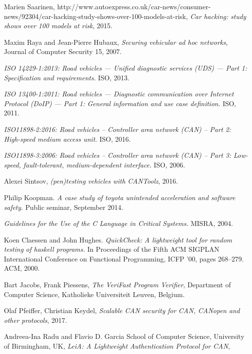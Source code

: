 \documentclass[11pt]{article}
\begin{document}
\begin{thebibliography}{10}
	Marien Saarinen, http://www.autoexpress.co.uk/car-news/consumer-news/92304/car-hacking-study-shows-over-100-models-at-risk, 
	\textit{Car hacking: study shows over 100 models at risk},
	2015.
	
	Maxim Raya and Jean-Pierre Hubaux, \textit{Securing vehicular ad hoc networks}, Journal of Computer Security 15, 2007.

	\textit{ISO 14229-1:2013: Road vehicles — Unified diagnostic services (UDS) — Part 1: Specification and requirements.}
	ISO, 2013.
	
	\textit{ISO 13400-1:2011: Road vehicles — Diagnostic communication over Internet Protocol (DoIP) — Part 1: General information and use case definition.} ISO, 2011.
	
	\textit{ISO11898-2:2016: Road vehicles -- Controller area network (CAN) -- Part 2: High-speed medium access unit.} ISO, 2016.
	
	\textit{ISO11898-3:2006: Road vehicles -- Controller area network (CAN) -- Part 3: Low-speed, fault-tolerant, medium-dependent interface.} ISO, 2006.
	
	Alexei Sintsov, 
	\textit{(pen)testing vehicles with CANToolz},
	2016.
	
	Philip Koopman. \textit{A case study of toyota unintended acceleration and software safety.} Public seminar, September 2014.
	
	\textit{Guidelines for the Use of the C Language in Critical Systems.} MISRA, 2004.
	
	Koen Claessen and John Hughes. 
	\textit{QuickCheck: A lightweight tool for random testing of haskell programs.} In Proceedings of the Fifth ACM SIGPLAN International Conference on Functional Programming, ICFP ’00, pages 268–279. ACM, 2000.
	
	Bart Jacobs, Frank Piessens,
	\textit{The VeriFast Program Verifier}, Department of Computer Science, Katholieke Universiteit Leuven, Belgium.
	
	Olaf Pfeiffer, Christian Keydel, 
	\textit{Scalable CAN security for CAN, CANopen and other protocols}, 2017.
	
	Andreea-Ina Radu and Flavio D. Garcia
	School of Computer Science,
	University of Birmingham, UK, 
	\textit{LeiA: A Lightweight Authentication Protocol for CAN},
	

\end{thebibliography}
\end{document}
